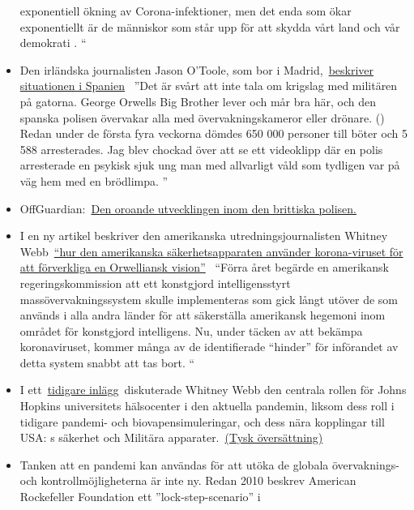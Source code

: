 \begin{itemize}
  exponentiell ökning av Corona-infektioner, men det enda som ökar
  exponentiellt är de människor som står upp för att skydda vårt land
  och vår demokrati . ``
\item
  Den irländska journalisten Jason O'Toole, som bor i
  Madrid,~\href{https://www.rt.com/op-ed/486350-spain-tough-rules-covid-19-lockdown/}{beskriver
  situationen i Spanien}~ ''Det är svårt att inte tala om krigslag med
  militären på gatorna. George Orwells Big Brother lever och mår bra
  här, och den spanska polisen övervakar alla med övervakningskameror
  eller drönare. () Redan under de första fyra veckorna dömdes 650 000
  personer till böter och 5 588 arresterades. Jag blev chockad över att
  se ett videoklipp där en polis arresterade en psykisk sjuk ung man med
  allvarligt våld som tydligen var på väg hem med en brödlimpa. ''
\item
  OffGuardian:~\href{https://off-guardian.org/2020/04/18/the-disturbing-developments-in-uk-policing/}{Den
  oroande utvecklingen inom den brittiska polisen.}
\item
  I en ny artikel beskriver den amerikanska utredningsjournalisten
  Whitney
  Webb~\href{https://www.thelastamericanvagabond.com/top-news/techno-tyranny-how-us-national-security-state-using-coronavirus-fulfill-orwellian-vision/}{``hur
  den amerikanska säkerhetsapparaten använder korona-viruset för att
  förverkliga en Orwelliansk vision''}~ ``Förra året begärde en
  amerikansk regeringskommission att ett konstgjord intelligensstyrt
  massövervakningssystem skulle implementeras som gick långt utöver de
  som används i alla andra länder för att säkerställa amerikansk
  hegemoni inom området för konstgjord intelligens. Nu, under täcken av
  att bekämpa koronaviruset, kommer många av de identifierade ``hinder''
  för införandet av detta system snabbt att tas bort. ``
\item
  I
  ett~\href{https://www.thelastamericanvagabond.com/top-news/all-roads-lead-dark-winter/}{tidigare
  inlägg}~diskuterade Whitney Webb den centrala rollen för Johns Hopkins
  universitets hälsocenter i den aktuella pandemin, liksom dess roll i
  tidigare pandemi- och biovapensimuleringar, och dess nära kopplingar
  till USA: s säkerhet och Militära
  apparater.~\href{https://www.theblogcat.de/uebersetzungen/dark-winter-01-04-2020/}{(Tysk
  översättning)}
\item
  Tanken att en pandemi kan användas för att utöka de globala
  övervaknings- och kontrollmöjligheterna är inte ny. Redan 2010 beskrev
  American Rockefeller Foundation ett ''lock-step-scenario'' i

\end{itemize}
